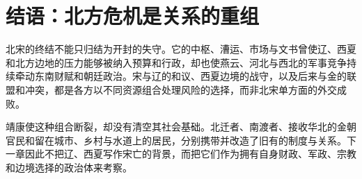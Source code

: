 \section{结语：北方危机是关系的重组}

北宋的终结不能只归结为开封的失守。它的中枢、漕运、市场与文书曾使辽、西夏和北方边地的压力能够被纳入预算和行政，却也使燕云、河北与西北的军事竞争持续牵动东南财赋和朝廷政治。宋与辽的和议、西夏边境的战守，以及后来与金的联盟和冲突，都是各方以不同资源组合处理风险的选择，而非北宋单方面的外交成败。

靖康使这种组合断裂，却没有清空其社会基础。北迁者、南渡者、接收华北的金朝官民和留在城市、乡村与水道上的居民，分别携带并改造了旧有的制度与关系。下一章因此不把辽、西夏写作宋亡的背景，而把它们作为拥有自身财政、军政、宗教和边境选择的政治体来考察。

